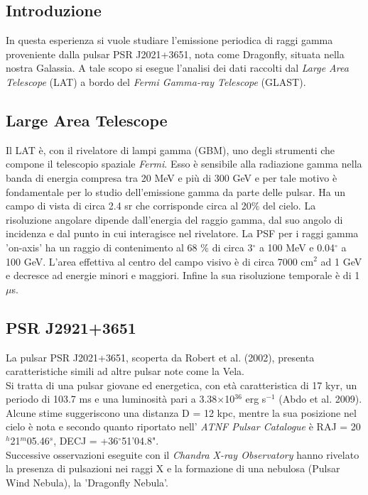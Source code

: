 \documentclass[a4paper,twocolumn]{article}
\begin{document}
\begin{large}

\section{Introduzione}
In questa esperienza si vuole studiare l'emissione periodica di raggi gamma proveniente dalla pulsar PSR J2021+3651, nota come Dragonfly, situata nella nostra Galassia. A tale scopo si esegue l'analisi dei dati raccolti dal \textit{Large Area Telescope} (LAT) a bordo del \textit{Fermi Gamma-ray Telescope} (GLAST).


\subsection{Large Area Telescope}
Il LAT è, con il rivelatore di lampi gamma (GBM), uno degli strumenti che compone il telescopio spaziale \textit{Fermi}. Esso è sensibile alla radiazione gamma nella banda di energia compresa tra 20 MeV e più di 300 GeV e per tale motivo è fondamentale per lo studio dell'emissione gamma da parte delle pulsar. Ha un campo di vista di circa 2.4 sr che corrisponde circa al 20$\%$ del cielo. La risoluzione angolare dipende dall'energia del raggio gamma, dal suo angolo di incidenza e dal punto in cui interagisce nel rivelatore. La PSF per i raggi gamma 'on-axis' ha un raggio di contenimento al 68 $\%$ di circa 3$^{\circ}$ a 100 MeV e 0.04$^{\circ}$ a 100 GeV. L'area effettiva al centro del campo visivo  è di circa 7000 cm$^2$ ad 1 GeV e decresce ad energie minori e maggiori. Infine la sua risoluzione temporale è di 1 $\mu$s.

\subsection{PSR J2921+3651}
La pulsar PSR J2021+3651, scoperta da Robert et al. (2002), presenta caratteristiche simili ad altre pulsar note come la Vela.\\
Si tratta di una pulsar giovane ed energetica, con età caratteristica di 17 kyr, un periodo di 103.7 ms e una luminosità pari a 3.38$\times$10$^{36}$ erg s$^{-1}$ (Abdo et al. 2009).
Alcune stime suggeriscono una distanza D = 12 kpc, mentre la sua posizione nel cielo è nota e secondo quanto riportato nell' \textit{ATNF Pulsar Catalogue} è RAJ = 20$^h$21$^m$05.46$^s$, DECJ = +36$^\circ$51'04.8".\\
Successive osservazioni eseguite con il \textit{Chandra X-ray Observatory} hanno rivelato la presenza di pulsazioni nei raggi X e la formazione di una nebulosa (Pulsar Wind Nebula), la 'Dragonfly Nebula'.


\end{large}
\end{document}
